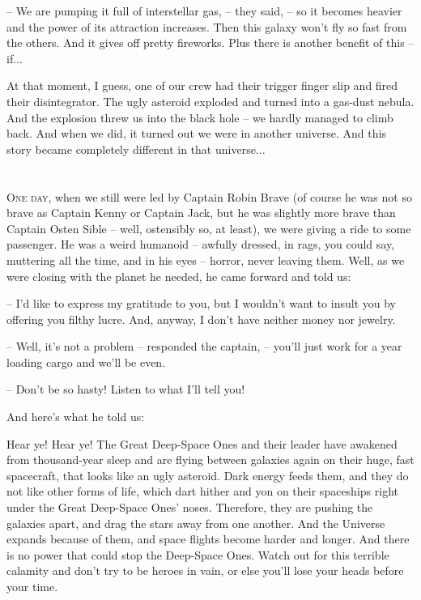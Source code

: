 \documentclass[ebook,oneside,final,openright]{memoir}
\begin{document}
– We are pumping it full of interstellar gas, – they said, – so it becomes heavier and the power of its attraction increases. Then this galaxy won’t fly so fast from the others. And it gives off pretty fireworks. Plus there is another benefit of this – if...\par
At that moment, I guess, one of our crew had their trigger finger slip and fired their disintegrator. The ugly asteroid exploded and turned into a gas-dust nebula. And the explosion threw us into the black hole – we hardly managed to climb back. And when we did, it turned out we were in another universe. And this story became completely different in that universe...
\chapter{}
\par
\lettrine{O}{ne day,} when we still were led by Captain Robin Brave (of course he was not so brave as Captain Kenny or Captain Jack, but he was slightly more brave than Captain Osten Sible – well, ostensibly so, at least), we were giving a ride to some passenger. He was a weird humanoid – awfully dressed, in rags, you could say, muttering all the time, and in his eyes – horror, never leaving them. Well, as we were closing with the planet he needed, he came forward and told us: \par
\par
– I’d like to express my gratitude to you, but I wouldn’t want to insult you by offering you filthy lucre. And, anyway, I don’t have neither money nor jewelry.\par
– Well, it’s not a problem – responded the captain, – you’ll just work for a year loading cargo and we’ll be even. \par
– Don’t be so hasty! Listen to what I’ll tell you! \par
 And here’s what he told us:\par
\par
Hear ye! Hear ye! The Great Deep-Space Ones and their leader have awakened from thousand-year sleep and are flying between galaxies again on their huge, fast spacecraft, that looks like an ugly asteroid. Dark energy feeds them, and they do not like other forms of life, which dart hither and yon on their spaceships right under the Great Deep-Space Ones’ noses. Therefore, they are pushing the galaxies apart, and drag the stars away from one another. And the Universe expands because of them, and space flights become harder and longer. And there is no power that could stop the Deep-Space Ones. Watch out for this terrible calamity and don’t try to be heroes in vain, or else you’ll lose your heads before your time.\par
\end{document}
